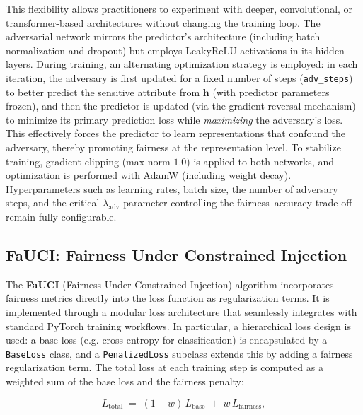 \documentclass[12pt,a4paper,openright,twoside]{book}
\begin{document}
This flexibility allows practitioners to experiment with deeper, convolutional, or transformer-based architectures without changing the training loop.  The adversarial network mirrors the predictor's architecture (including batch normalization and dropout) but employs LeakyReLU activations in its hidden layers.  During training, an alternating optimization strategy is employed: in each iteration, the adversary is first updated for a fixed number of steps (\texttt{adv\_steps}) to better predict the sensitive attribute from $\mathbf{h}$ (with predictor parameters frozen), and then the predictor is updated (via the gradient-reversal mechanism) to minimize its primary prediction loss while \emph{maximizing} the adversary’s loss.  This effectively forces the predictor to learn representations that confound the adversary, thereby promoting fairness at the representation level.  To stabilize training, gradient clipping (max-norm $1.0$) is applied to both networks, and optimization is performed with AdamW (including weight decay).  Hyperparameters such as learning rates, batch size, the number of adversary steps, and the critical $\lambda_{\text{adv}}$ parameter controlling the fairness–accuracy trade-off remain fully configurable.

\subsection{FaUCI: Fairness Under Constrained Injection}
The \textbf{FaUCI} (Fairness Under Constrained Injection) algorithm incorporates fairness metrics directly into the loss function as regularization terms. It is implemented through a modular loss architecture that seamlessly integrates with standard PyTorch training workflows. In particular, a hierarchical loss design is used: a base loss (e.g. cross-entropy for classification) is encapsulated by a \texttt{BaseLoss} class, and a \texttt{PenalizedLoss} subclass extends this by adding a fairness regularization term. The total loss at each training step is computed as a weighted sum of the base loss and the fairness penalty:

\begin{equation}
    L_{\text{total}} \;=\; (1 - w)\,L_{\text{base}} \;+\; w\,L_{\text{fairness}},
\end{equation}
\end{document}

